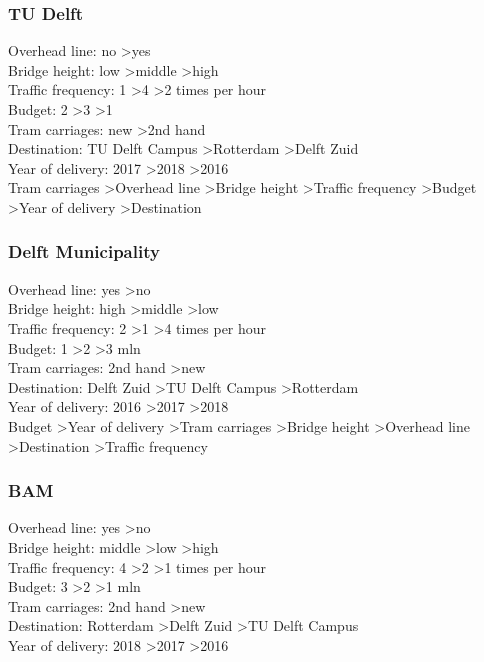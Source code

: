 \documentclass{article}
\begin{document}
\subsubsection{TU Delft}
Overhead line: no \textgreater yes \\
Bridge height: low \textgreater middle \textgreater high \\
Traffic frequency: 1 \textgreater 4 \textgreater 2 times per hour \\
Budget: 2 \textgreater 3 \textgreater 1 \\
Tram carriages: new \textgreater 2nd hand \\
Destination: TU Delft Campus \textgreater Rotterdam \textgreater Delft Zuid \\
Year of delivery: 2017 \textgreater 2018 \textgreater 2016 \\

Tram carriages \textgreater Overhead line \textgreater Bridge height \textgreater Traffic frequency \textgreater Budget \textgreater Year of delivery \textgreater Destination\\


\subsubsection{Delft Municipality}
Overhead line: yes \textgreater no \\
Bridge height: high \textgreater middle \textgreater low \\
Traffic frequency: 2 \textgreater 1 \textgreater 4 times per hour \\
Budget: 1 \textgreater 2 \textgreater 3 mln \\
Tram carriages: 2nd hand \textgreater new \\
Destination: Delft Zuid \textgreater TU Delft Campus \textgreater Rotterdam \\
Year of delivery: 2016 \textgreater 2017 \textgreater 2018 \\

Budget \textgreater Year of delivery \textgreater Tram carriages \textgreater Bridge height \textgreater Overhead line \textgreater Destination \textgreater Traffic frequency\\


\subsubsection{BAM}
Overhead line: yes \textgreater no \\
Bridge height: middle \textgreater low \textgreater high \\
Traffic frequency: 4 \textgreater 2 \textgreater 1 times per hour \\
Budget: 3 \textgreater 2 \textgreater 1 mln \\
Tram carriages: 2nd hand \textgreater new \\
Destination: Rotterdam \textgreater Delft Zuid \textgreater TU Delft Campus \\
Year of delivery: 2018 \textgreater 2017 \textgreater 2016 \\
\end{document}
